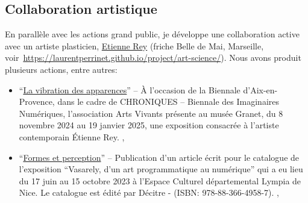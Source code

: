 \documentclass[10pt,french,a4paper,oneside]{article}%
\newcommand{\years}[1]{\marginpar{\textit{\scriptsize #1}}}
\begin{document}
\subsection{Collaboration artistique} %

En parallèle avec les actions grand public, je développe une collaboration active avec un artiste plasticien, \href{https://laurentperrinet.github.io/author/etienne-rey/}{Etienne Rey} (friche Belle de Mai, Marseille, voir~\url{https://laurentperrinet.github.io/project/art-science/}). Nous avons produit plusieurs actions, entre autres:

\begin{itemize}


	\item ``\href{https://laurentperrinet.github.io/post/2024-11-07_vibration-apparences/}{La vibration des apparences}'' – À l’occasion de la Biennale d’Aix-en-Provence, dans le cadre de CHRONIQUES – Biennale des Imaginaires Numériques, l’association Arts Vivants présente au musée Granet, du 8 novembre 2024 au 19 janvier 2025, une exposition consacrée à l’artiste contemporain Étienne Rey. \years{2024},
	\item ``\href{https://laurentperrinet.github.io/publication/perrinet-23-formes-et-perception/}{Formes et perception}'' – Publication d’un article écrit pour le catalogue de l’exposition “Vasarely, d’un art programmatique au numérique” qui a eu lieu du 17 juin au 15 octobre 2023 à l’Espace Culturel départemental Lympia de Nice. Le catalogue est édité par Décitre - (ISBN: 978-88-366-4958-7). \years{2025},
	

\end{itemize}
\end{document}
